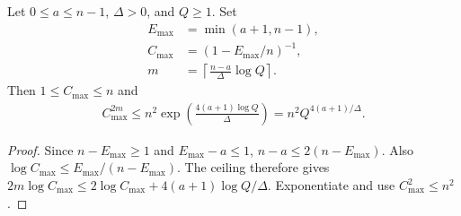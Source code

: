 \begin{theorem}
    \label{thm:power_sampling_interval_normalization}
    \leanok
    Let $0\le a\le n-1$, $\Delta>0$, and $Q\ge1$. Set
    \begin{align}
        E_{\max}&=\min(a+1,n-1),\\
        C_{\max}&=(1-E_{\max}/n)^{-1},\\
        m&=\left\lceil\frac{n-a}{\Delta}\log Q\right\rceil.
        \label{eq:power_sampling_interval_parameters}
    \end{align}
    Then $1\le C_{\max}\le n$ and
    \begin{align}
        C_{\max}^{2m}\le n^2\exp\left(\frac{4(a+1)\log Q}{\Delta}\right)
        =n^2Q^{4(a+1)/\Delta}.
        \label{eq:power_sampling_interval_normalization}
    \end{align}
\end{theorem}
\begin{proof}\leanok
    Since $n-E_{\max}\ge1$ and $E_{\max}-a\le1$,
    $n-a\le2(n-E_{\max})$. Also
    $\log C_{\max}\le E_{\max}/(n-E_{\max})$.
    The ceiling therefore gives
    $2m\log C_{\max}\le2\log C_{\max}+4(a+1)\log Q/\Delta$.
    Exponentiate and use $C_{\max}^2\le n^2$.
\end{proof}
